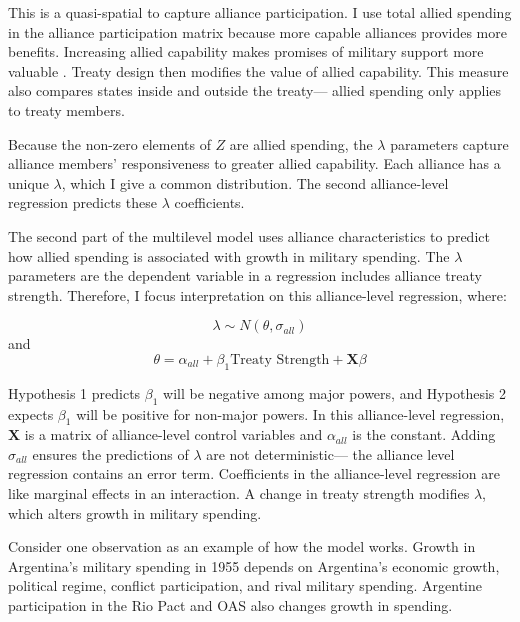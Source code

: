 \documentclass[12pt]{article}
\begin{document}
This is a quasi-spatial to capture alliance participation. 
I use total allied spending in the alliance participation matrix because more capable alliances provides more benefits.
Increasing allied capability makes promises of military support more valuable \citep{Johnsonetal2015}.  
Treaty design then modifies the value of allied capability.   
This measure also compares states inside and outside the treaty--- allied spending only applies to treaty members. 


Because the non-zero elements of $Z$ are allied spending, the $\lambda$ parameters capture alliance members' responsiveness to greater allied capability. 
Each alliance has a unique $\lambda$, which I give a common distribution. 
The second alliance-level regression predicts these $\lambda$ coefficients. 


The second part of the multilevel model uses alliance characteristics to predict how allied spending is associated with growth in military spending. 
The $\lambda$ parameters are the dependent variable in a regression includes alliance treaty strength.
Therefore, I focus interpretation on this alliance-level regression, where: 

\begin{equation}
\lambda \sim N(\theta, \sigma_{all})
\end{equation} 
and 
\begin{equation}
\theta = \alpha_{all} + \beta_1 \mbox{Treaty Strength} + \textbf{X} \beta
\end{equation}

Hypothesis 1 predicts $\beta_1$ will be negative among major powers, and Hypothesis 2 expects $\beta_1$ will be positive for non-major powers. 
In this alliance-level regression, $\textbf{X}$ is a matrix of alliance-level control variables and $\alpha_{all}$ is the constant.
Adding $\sigma_{all}$ ensures the predictions of $\lambda$ are not deterministic--- the alliance level regression contains an error term. 
Coefficients in the alliance-level regression are like marginal effects in an interaction. 
A change in treaty strength modifies $\lambda$, which alters growth in military spending. 


Consider one observation as an example of how the model works. 
Growth in Argentina's military spending in 1955 depends on Argentina's economic growth, political regime, conflict participation, and rival military spending. 
Argentine participation in the Rio Pact and OAS also changes growth in spending. 
\end{document}
